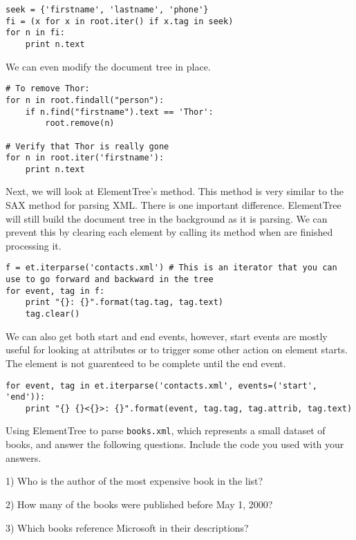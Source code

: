 \begin{lstlisting}
seek = {'firstname', 'lastname', 'phone'}
fi = (x for x in root.iter() if x.tag in seek)
for n in fi:
    print n.text
\end{lstlisting}

We can even modify the document tree in place.

\begin{lstlisting}
# To remove Thor:
for n in root.findall("person"):
    if n.find("firstname").text == 'Thor':
        root.remove(n)

# Verify that Thor is really gone
for n in root.iter('firstname'):
    print n.text
\end{lstlisting}

Next, we will look at ElementTree's  method.
This method is very similar to the SAX method for parsing XML.
There is one important difference.
ElementTree will still build the document tree in the background as it is parsing.
We can prevent this by clearing each element by calling its  method when are finished processing it.

\begin{lstlisting}
f = et.iterparse('contacts.xml') # This is an iterator that you can use to go forward and backward in the tree
for event, tag in f:
    print "{}: {}".format(tag.tag, tag.text)
    tag.clear()
\end{lstlisting}

We can also get both start and end events, however, start events are mostly useful for looking at attributes or to trigger some other action on element starts.
The element is not guarenteed to be complete until the end event.

\begin{lstlisting}
for event, tag in et.iterparse('contacts.xml', events=('start', 'end')):
    print "{} {}<{}>: {}".format(event, tag.tag, tag.attrib, tag.text)
\end{lstlisting}

\begin{problem} %
Using ElementTree to parse \texttt{books.xml}, which represents a small dataset of books, and answer the following questions.
Include the code you used with your answers.

1) Who is the author of the most expensive book in the list?

2) How many of the books were published before May 1, 2000?

3) Which books reference Microsoft in their descriptions?
\end{problem}


